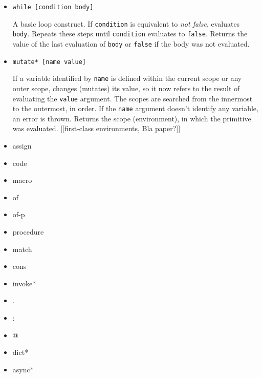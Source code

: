 \begin{itemize}
    \item \texttt{while [condition body]}
    
    A basic loop construct. If \texttt{condition} is equivalent to \textit{not
      false}, evaluates \texttt{body}. Repeats these steps until
    \texttt{condition} evaluates to \texttt{false}. Returns the value of the
    last evaluation of \texttt{body} or \texttt{false} if the body was not
    evaluated.
    
    \item \texttt{mutate* [name value]}
    
    If a variable identified by \texttt{name} is defined within the current
    scope or any outer scope, changes (mutates) its value, so it now refers to
    the result of evaluating the \texttt{value} argument. The scopes are
    searched from the innermost to the outermost, in order. If the \texttt{name}
    argument doesn't identify any variable, an error is thrown. Returns the
    scope (environment), in which the primitive was evaluated. [[first-class
        environments, Bla paper?]]
    
    \item assign
    
    \item code
    
    \item macro
    
    \item of
    
    \item of-p
    
    \item procedure
    
    \item match
    
    \item cons
    
    \item invoke*
    
    \item .

    \item :
    
    \item @
    
    \item dict*
    
    \item async*
\end{itemize}


